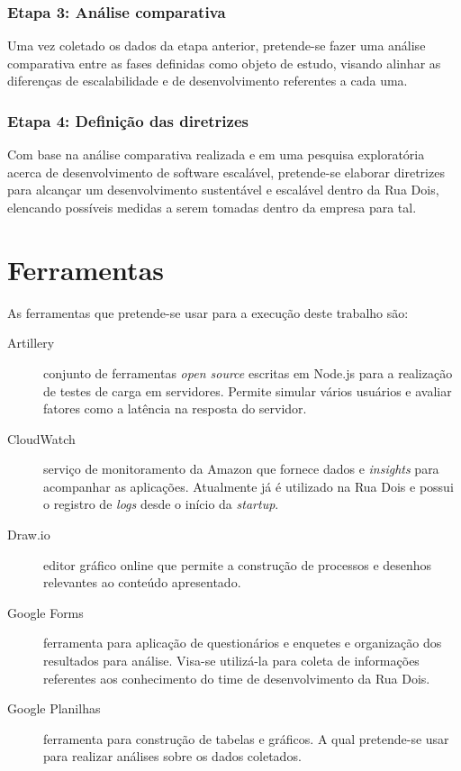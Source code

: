 \subsubsection{Etapa 3: Análise comparativa}

Uma vez coletado os dados da etapa anterior, pretende-se fazer uma análise comparativa
entre as fases definidas como objeto de estudo, visando alinhar as diferenças de
escalabilidade e de desenvolvimento referentes a cada uma.

\subsubsection{Etapa 4: Definição das diretrizes}

Com base na análise comparativa realizada e em uma pesquisa exploratória acerca de
desenvolvimento de software escalável, pretende-se elaborar diretrizes para alcançar
um desenvolvimento sustentável e escalável dentro da Rua Dois, elencando possíveis
medidas a serem tomadas dentro da empresa para tal.


\section{Ferramentas}

As ferramentas que pretende-se usar para a execução deste trabalho são:

\begin{description}
    \item[Artillery] conjunto de ferramentas \textit{open source} escritas em Node.js
    para a realização de testes de carga em servidores. Permite simular vários usuários
    e avaliar fatores como a latência na resposta do servidor.
    \item[CloudWatch] serviço de monitoramento da Amazon que fornece dados e
    \textit{insights} para acompanhar as aplicações. Atualmente já é utilizado na
    Rua Dois e possui o registro de \textit{logs} desde o início da \textit{startup}.
    \item[Draw.io] editor gráfico online que permite a construção de processos e
    desenhos relevantes ao conteúdo apresentado.
    \item[Google Forms] ferramenta para aplicação de questionários e enquetes
    e organização dos resultados para análise. Visa-se utilizá-la para coleta
    de informações referentes aos conhecimento do time de desenvolvimento da Rua Dois.
    \item[Google Planilhas] ferramenta para construção de tabelas e gráficos.
    A qual pretende-se usar para realizar análises sobre os dados coletados.
\end{description}

